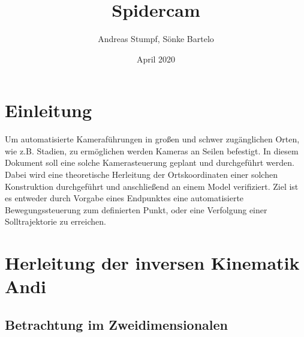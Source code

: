 \documentclass[a4paper, 12pt]{article}
\title{Spidercam}
\date{April 2020}
\author{Andreas Stumpf, Sönke Bartelo}
\begin{document}
	\maketitle
	\newpage
	\tableofcontents
	\pagebreak
	\listoffigures
	\pagebreak
	\section{Einleitung}
	Um automatisierte Kameraführungen in großen und schwer zugänglichen Orten, wie z.B. Stadien, zu ermöglichen werden Kameras an Seilen befestigt.
	In diesem Dokument soll eine solche Kamerasteuerung geplant und durchgeführt werden.
	Dabei wird eine theoretische Herleitung der Ortskoordinaten einer solchen Konstruktion durchgeführt und anschließend an einem Model verifiziert.
	Ziel ist es entweder durch Vorgabe eines Endpunktes eine automatisierte Bewegungssteuerung zum definierten Punkt, oder eine Verfolgung einer Solltrajektorie zu erreichen.
	\pagebreak
	\section{Herleitung der inversen Kinematik Andi}
		\subsection{Betrachtung im Zweidimensionalen}
\end{document}
